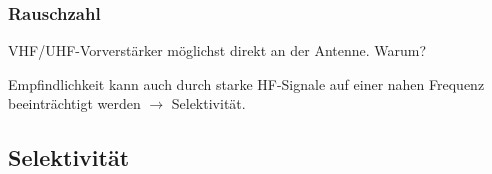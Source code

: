 \begin{frame}
  \frametitle{Rauschzahl}

  VHF/UHF-Vorverstärker möglichst direkt an der Antenne. Warum?\\

  \bigskip

  Empfindlichkeit kann auch durch starke HF-Signale auf einer nahen Frequenz
  beeinträchtigt werden $\rightarrow$ Selektivität.

\end{frame}

\subsection{Selektivität}

